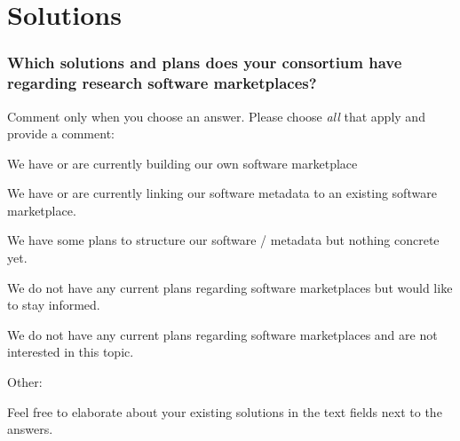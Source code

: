 \documentclass[headsepline,titlepage,twoside,12pt,toc=flat,headings=normal]{scrreprt}
\newcommand{\question}[1]{\subsubsection{#1}}
\newcommand{\otherbox}{\fbox{\phantom{This is how big an answer would be.}}}
\begin{document}
\section{Solutions}
\question{Which solutions and plans does your consortium have regarding research software marketplaces?}

Comment only when you choose an answer.
Please choose \emph{all} that apply and provide a comment:

\begin{answers}
\item We have or are currently building our own software marketplace
\item We have or are currently linking our software metadata to an existing software marketplace.
\item We have some plans to structure our software / metadata but nothing concrete yet.
\item We do not have any current plans regarding software marketplaces but would like to stay informed.
\item We do not have any current plans regarding software marketplaces and are not interested in this topic.
\item Other: \otherbox
\end{answers}

Feel free to elaborate about your existing solutions in the text fields
next to the answers.
\end{document}
